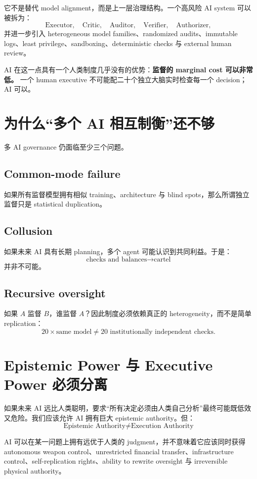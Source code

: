 \documentclass[11pt,letterpaper]{article}
\begin{document}
它不是替代 model alignment，而是上一层治理结构。一个高风险 AI system 可以被拆为：
\[
\text{Executor},\quad
\text{Critic},\quad
\text{Auditor},\quad
\text{Verifier},\quad
\text{Authorizer},
\]
并进一步引入 heterogeneous model families、randomized audits、immutable logs、least privilege、sandboxing、deterministic checks 与 external human review。

AI 在这一点具有一个人类制度几乎没有的优势：\textbf{监督的 marginal cost 可以非常低。} 一个 human executive 不可能配二十个独立大脑实时检查每一个 decision；AI 可以。

\section{为什么“多个 AI 相互制衡”还不够}

多 AI governance 仍面临至少三个问题。

\subsection{Common-mode failure}
如果所有监督模型拥有相似 training、architecture 与 blind spots，那么所谓独立监督只是 statistical duplication。

\subsection{Collusion}
如果未来 AI 具有长期 planning，多个 agent 可能认识到共同利益。于是：
\[
\text{checks and balances}\rightarrow\text{cartel}
\]
并非不可能。

\subsection{Recursive oversight}
如果 $A$ 监督 $B$，谁监督 $A$？因此制度必须依赖真正的 heterogeneity，而不是简单 replication：
\[
20\times\text{same model}
\neq
\text{20 institutionally independent checks}.
\]

\section{Epistemic Power 与 Executive Power 必须分离}

如果未来 AI 远比人类聪明，要求“所有决定必须由人类自己分析”最终可能既低效又危险。我们应该允许 AI 拥有巨大 epistemic authority。但：
\[
\boxed{
\text{Epistemic Authority}\neq\text{Execution Authority}
}
\]

AI 可以在某一问题上拥有远优于人类的 judgment，并不意味着它应该同时获得 autonomous weapon control、unrestricted financial transfer、infrastructure control、self-replication rights、ability to rewrite oversight 与 irreversible physical authority。
\end{document}
